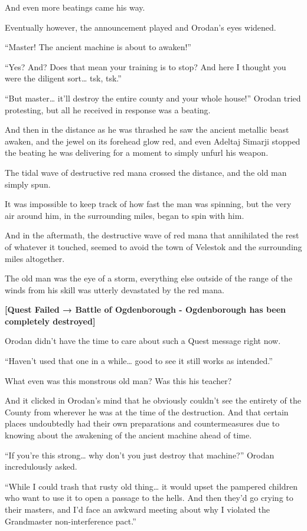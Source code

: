 \documentclass[a4paper,10pt]{book}
\begin{document}
And even more beatings came his way.\par
Eventually however, the announcement played and Orodan’s eyes widened.\par
“Master! The ancient machine is about to awaken!”\par
“Yes? And? Does that mean your training is to stop? And here I thought you were the diligent sort… tsk, tsk.”\par
“But master… it’ll destroy the entire county and your whole house!” Orodan tried protesting, but all he received in response was a beating.\par
And then in the distance as he was thrashed he saw the ancient metallic beast awaken, and the jewel on its forehead glow red, and even Adeltaj Simarji stopped the beating he was delivering for a moment to simply unfurl his weapon.\par
The tidal wave of destructive red mana crossed the distance, and the old man simply spun.\par
It was impossible to keep track of how fast the man was spinning, but the very air around him, in the surrounding miles, began to spin with him.\par
And in the aftermath, the destructive wave of red mana that annihilated the rest of whatever it touched, seemed to avoid the town of Velestok and the surrounding miles altogether.\par
The old man was the eye of a storm, everything else outside of the range of the winds from his skill was utterly devastated by the red mana.\par
\textbf{[Quest Failed → Battle of Ogdenborough - Ogdenborough has been completely destroyed]}\par
Orodan didn’t have the time to care about such a Quest message right now.\par
“Haven’t used that one in a while… good to see it still works as intended.”\par
What even was this monstrous old man? Was this his teacher?\par
And it clicked in Orodan’s mind that he obviously couldn’t see the entirety of the County from wherever he was at the time of the destruction. And that certain places undoubtedly had their own preparations and countermeasures due to knowing about the awakening of the ancient machine ahead of time.\par
“If you’re this strong… why don’t you just destroy that machine?” Orodan incredulously asked.\par
“While I could trash that rusty old thing… it would upset the pampered children who want to use it to open a passage to the hells. And then they’d go crying to their masters, and I’d face an awkward meeting about why I violated the Grandmaster non-interference pact.”\par
\end{document}
